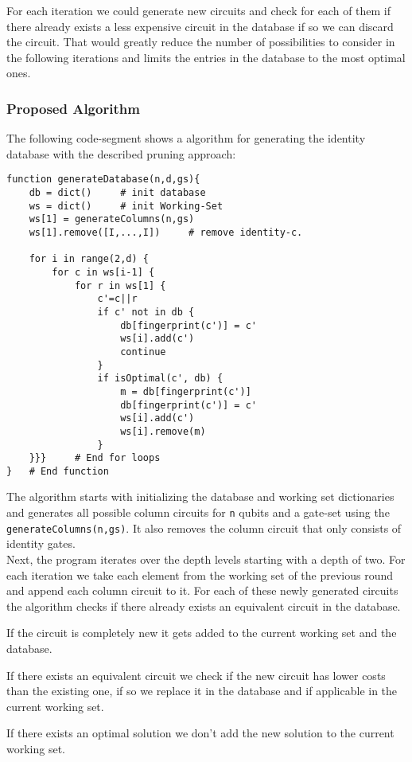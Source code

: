 For each iteration we could generate new circuits and check for each of them if there already exists a less expensive circuit in the database if so we can discard the circuit. That would greatly reduce the number of possibilities to consider in the following iterations and limits the entries in the database to the most optimal ones.

\subsubsection{Proposed Algorithm}

The following code-segment shows a algorithm for generating the identity database with the described pruning approach:
\begin{verbatim}
function generateDatabase(n,d,gs){
	db = dict() 	# init database
	ws = dict() 	# init Working-Set
	ws[1] = generateColumns(n,gs)
	ws[1].remove([I,...,I]) 	# remove identity-c.
	
	for i in range(2,d) {
		for c in ws[i-1] {
			for r in ws[1] {
				c'=c||r
				if c' not in db {
					db[fingerprint(c')] = c'
					ws[i].add(c')
					continue
				}
				if isOptimal(c', db) {
					m = db[fingerprint(c')]
					db[fingerprint(c')] = c'	
					ws[i].add(c')
					ws[i].remove(m)
				}
	}}} 	# End for loops
} 	# End function
\end{verbatim}

The algorithm starts with initializing the database and working set dictionaries and generates all possible column circuits for \texttt{n} qubits and a gate-set using the \texttt{generateColumns(n,gs)}. It also removes the column circuit that only consists of identity gates.\\

Next, the program iterates over the depth levels starting with a depth of two. For each iteration we take each element from the working set of the previous round and append each column circuit to it. For each of these newly generated circuits the algorithm checks if there already exists an equivalent circuit in the database. 

If the circuit is completely new it gets added to the current working set and the database. 

If there exists an equivalent circuit we check if the new circuit has lower costs than the existing one, if so we replace it in the database and if applicable in the current working set. 

If there exists an optimal solution we don't add the new solution to the current working set.

